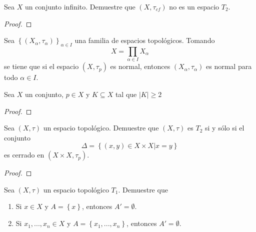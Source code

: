 \documentclass[12pt]{report}
\theoremstyle{largebreak}
\newcommand\abs[1]{\ensuremath{\left|#1\right|}}
\begin{document}
    \begin{excer}
        Sea $X$ un conjunto infinito. Demuestre que $(X,\tau_{cf})$ no es un espacio $T_2$.
    \end{excer}

    \begin{proof}
        
    \end{proof}

    \begin{excer}
        Sea $\left\{(X_\alpha,\tau_\alpha) \right\}_{\alpha\in I}$ una familia de espacios topológicos. Tomando
        \begin{equation*}
            X=\prod_{\alpha\in I}X_\alpha
        \end{equation*}
        se tiene que si el espacio $(X,\tau_p)$ es normal, entonces $(X_\alpha,\tau_\alpha)$ es normal para todo $\alpha\in I$. 
    \end{excer}

    \begin{excer}
        Sea $X$ un conjunto, $p\in X$ y $K\subseteq X$ tal que $\abs{K}\geq2$
    \end{excer}

    \begin{proof}
        
    \end{proof}

    \begin{excer}
        Sea $(X,\tau)$ un espacio topológico. Demuestre que $(X,\tau)$ es $T_2$ si y sólo si el conjunto
        \begin{equation*}
            \Delta=\left\{(x,y)\in X\times X\Big|x=y \right\}
        \end{equation*}
        es cerrado en $(X\times X,\tau_p)$.
    \end{excer}

    \begin{proof}
        
    \end{proof}

    \begin{excer}
        Sea $(X,\tau)$ un espacio topológico $T_1$. Demuestre que
        \begin{enumerate}
            \item Si $x\in X$ y $A=\left\{x\right\}$, entonces $A'=\emptyset$.
            \item Si $x_1,...,x_n\in X$ y $A=\left\{x_1,...,x_n\right\}$, entonces $A'=\emptyset$.
        \end{enumerate}
    \end{excer}
\end{document}
